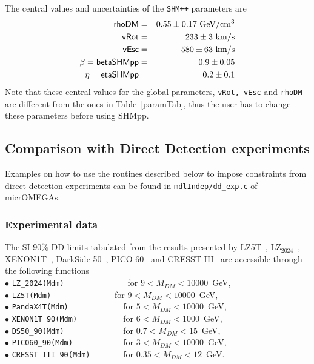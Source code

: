 \documentclass[12pt,a4paper]{article}
\begin{document}
The central values  and uncertainties   of   the {\tt SHM++} parameters are  
\begin{eqnarray}
\nonumber 
\textsf{rhoDM} &=&0.55\pm 0.17 ~{\rm GeV}/{\rm cm}^3\\
\nonumber
\textsf{vRot}&=& 233\pm 3 ~{\rm km/s}\\
\nonumber
\textsf{vEsc}&=& 580\pm 63~ {\rm km/s}\\
\nonumber
 \beta=\textsf{betaSHMpp} &=&0.9\pm 0.05\\
\eta= \textsf{etaSHMpp} &=& 0.2\pm 0.1 
\label{eq:SHMpp} 
\end{eqnarray}
\noindent
Note that these central values for the global parameters, {\tt vRot, vEsc} and {\tt rhoDM}   
are different from  the  ones in Table~\ref{paramTab}, thus the user has  to change these parameters before  using SHMpp.
 






\subsection{Comparison with Direct Detection experiments} 
\label{DDexp}

Examples on how to use the routines described below to impose constraints from direct detection experiments  can be found  in \verb|mdlIndep/dd_exp.c| of micrOMEGAs. 
\subsubsection{Experimental data}

The SI 90\%  DD  limits  tabulated from the results presented by LZ5T~\cite{LZ:2022lsv}, LZ$_2024$~\cite{LZ:2024zvo}, XENON1T~\cite{Aprile:2018dbl}, DarkSide-50~\cite{Agnes:2018ves}, PICO-60~\cite{Amole:2019fdf}  and CRESST-III~\cite{Abdelhameed:2019hmk}  are accessible through  the following functions \\

\noindent
\noindent
$\bullet$ \verb|LZ_2024(Mdm)              |  for $ 9 < M_{DM} < 10000$~GeV, \cite{LZ:2024zvo} \\
$\bullet$ \verb|LZ5T(Mdm)              |  for $ 9 < M_{DM} < 10000$~GeV, \cite{LZ:2022lsv} \\
$\bullet$ \verb|PandaX4T(Mdm)            |  for $ 5 < M_{DM} < 10000$~GeV, \cite{PandaX-4T:2021bab} \\
$\bullet$ \verb|XENON1T_90(Mdm)          | for  $ 6 <  M_{DM} < 1000$~GeV, \cite{Aprile:2018dbl}  \\
\noindent
$\bullet$ \verb|DS50_90(Mdm)             | for  $ 0.7 < M_{DM} < 15$~GeV, \cite{Agnes:2018ves}   \\
\noindent
$\bullet$ \verb|PICO60_90(Mdm)           | for  $ 3 < M_{DM} < 10000$~GeV, \cite{Amole:2019fdf}   \\
\noindent
$\bullet$ \verb|CRESST_III_90(Mdm)       |  for $ 0.35 < M_{DM} < 12$~GeV. \cite{Abdelhameed:2019hmk} \\
\end{document}
